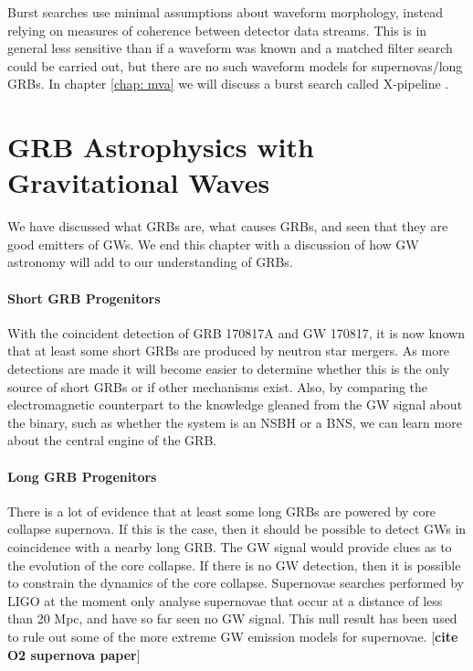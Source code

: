 \documentclass[11pt]{cuthesis}
\newcommand{\xp}{X-pipeline }
\begin{document}
Burst searches use minimal assumptions about waveform morphology, instead relying on measures of coherence between detector data streams. This is in general less sensitive than if a waveform was known and a matched filter search could be carried out, but there are no such waveform models for supernovas/long GRBs. In chapter \ref{chap: mva} we will discuss a burst search called \xp. 

\section{GRB Astrophysics with Gravitational Waves}
We have discussed what GRBs are, what causes GRBs, and seen that they are good emitters of GWs. We end this chapter with a discussion of how GW astronomy will add to our understanding of GRBs. 

\paragraph{Short GRB Progenitors}
With the coincident detection of GRB 170817A and GW 170817, it is now known that at least some short GRBs are produced by neutron star mergers. As more detections are made it will become easier to determine whether this is the only source of short GRBs or if other mechanisms exist. Also, by comparing the electromagnetic counterpart to the knowledge gleaned from the GW signal about the binary, such as whether the system is an NSBH or a BNS, we can learn more about the central engine of the GRB. 

\paragraph{Long GRB Progenitors}
There is a lot of evidence that at least some long GRBs are powered by core collapse supernova. If this is the case, then it should be possible to detect GWs in coincidence with a nearby long GRB. The GW signal would provide clues as to the evolution of the core collapse. If there is no GW detection, then it is possible to constrain the dynamics of the core collapse. Supernovae searches performed by LIGO at the moment only analyse supernovae that occur at a distance of less than 20 Mpc, and have so far seen no GW signal. This null result has been used to rule out some of the more extreme GW emission models for supernovae. [\textbf{cite O2 supernova paper}]
\end{document}
